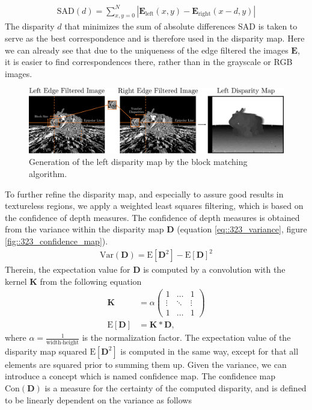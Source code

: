 \begin{align}
	\text{SAD}(d) = \sum_{x,y=0}^N |\bm{E}_\text{left}(x,y) - \bm{E}_\text{right}(x-d,y)|
	\label{eq::323_sad}
\end{align}
The disparity $d$ that minimizes the sum of absolute differences SAD is taken to serve as the best correspondence and is therefore used in the disparity map.  Here we can already see that due to the uniqueness of the edge filtered the images $\bm{E}$, it is easier to find correspondences there, rather than in the grayscale or RGB images.
\begin{figure}[h]
	\centering
	\includegraphics[scale=.28]{chapters/03_background/img/left_disparity_map.png}
	\caption{Generation of the left disparity map by the block matching algorithm.}
	\label{fig::323_left_disparity_map}
\end{figure}
To further refine the disparity map, and especially to assure good results in textureless  regions, we apply a weighted least squares filtering, which is based on the confidence of depth measures. The confidence of depth measures is obtained from the variance within the disparity map $\bm{D}$ (equation \ref{eq::323_variance}, figure \ref{fig::323_confidence_map}).
\begin{align}
	 \text{Var}(\bm{D}) = \text{E}\left[\bm{D}^2\right] - \text{E}\left[\bm{D}\right]^2
	\label{eq::323_variance}
\end{align} 
Therein, the expectation value for $\bm{D}$ is computed by a convolution with the kernel $\bm{K}$ from the following equation
\begin{align}
	\bm{K} &= \alpha
	\begin{pmatrix}
	1 & \dots & 1 \\
	\vdots & \ddots & \vdots \\
	1 & \dots & 1
	\end{pmatrix} \\
	\text{E}\left[\bm{D}\right] &= \bm{K}*\bm{D},
	\label{eq::323_kernel}
\end{align}
where $\alpha = \frac{1}{\text{width}\cdot\text{height}}$ is the normalization factor. The expectation value of the disparity map squared $\text{E}\left[\bm{D}^2\right]$ is computed in the same way, except for that all elements are squared prior to summing them up. Given the variance, we can introduce a concept which is named confidence map. The confidence map $\text{Con}(\bm{D})$ is a measure for the certainty of the computed disparity, and is defined to be linearly dependent on the variance as follows
